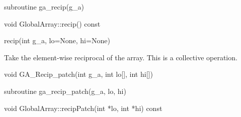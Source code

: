 \documentclass[12pt]{article}
\begin{document}
\begin{fapi}
\begin{fcode}
subroutine ga_recip(g_a)
\end{fcode}
\begin{funcargs}
\end{funcargs}
\end{fapi}

\begin{cxxapi}
\begin{cxxcode}
void GlobalArray::recip() const
\end{cxxcode}
\end{cxxapi}

\begin{pyapi}
\begin{pycode}
recip(int g_a, lo=None, hi=None) 
\end{pycode}
\end{pyapi}
\gcoll

\begin{desc}

Take the element-wise reciprocal of the array.
This is a collective operation.
\end{desc}


\begin{capi}
\begin{ccode}
void GA_Recip_patch(int g_a, int lo[], int hi[])
\end{ccode}
\begin{funcargs}
\end{funcargs}
\end{capi}

\begin{fapi}
\begin{fcode}
subroutine ga_recip_patch(g_a, lo, hi)
\end{fcode}
\begin{funcargs}
\end{funcargs}
\end{fapi}

\begin{cxxapi}
\begin{cxxcode}
void GlobalArray::recipPatch(int *lo, int *hi) const
\end{cxxcode}
\begin{funcargs}
\end{funcargs}
\end{cxxapi}
\gcoll
\end{document}
